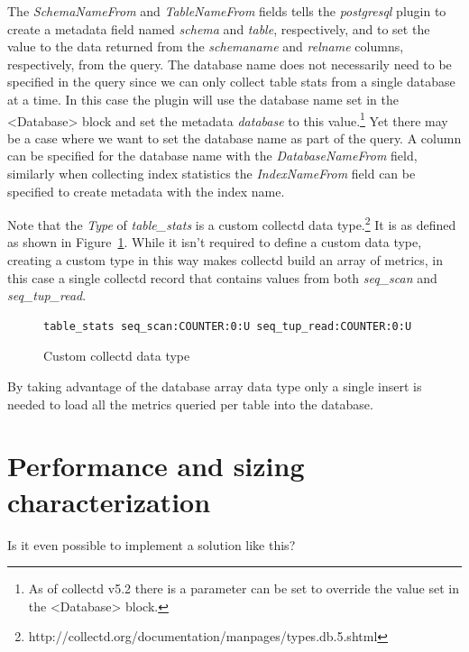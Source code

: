 \documentclass[twocolumn,letterpaper]{article}
\begin{document}
The \textit{SchemaNameFrom} and \textit{TableNameFrom} fields tells the
\textit{postgresql} plugin to create a metadata field named \textit{schema} and
\textit{table}, respectively, and to set the value to the data returned from
the \textit{schemaname} and \textit{relname} columns, respectively, from the
query.  The database name does not necessarily need to be specified in the
query since we can only collect table stats from a single database at a time.
In this case the plugin will use the database name set in the <Database> block
and set the metadata \textit{database} to this value.\footnote{As of collectd
v5.2 there is a parameter can be set to override the value set in the
<Database> block.}  Yet there may be a case where we want to set the database
name as part of the query.  A column can be specified for the database name
with the \textit{DatabaseNameFrom} field, similarly when collecting index
statistics the \textit{IndexNameFrom} field can be specified to create metadata
with the index name.

Note that the \textit{Type} of \textit{table\_stats} is a custom collectd data
type.\footnote{http://collectd.org/documentation/manpages/types.db.5.shtml}  It
is as defined as shown in Figure~\ref{fig:custom_type}.  While it isn't
required to define a custom data type, creating a custom type in this way makes
collectd build an array of metrics, in this case a single collectd record that
contains values from both \textit{seq\_scan} and \textit{seq\_tup\_read}.

\begin{figure}
  \begin{lstlisting}
table_stats seq_scan:COUNTER:0:U seq_tup_read:COUNTER:0:U
  \end{lstlisting}
  \caption{Custom collectd data type}
  \label{fig:custom_type}
\end{figure}

By taking advantage of the database array data type only a single insert is
needed to load all the metrics queried per table into the database.

\section{Performance and sizing characterization}

Is it even possible to implement a solution like this?
\end{document}
